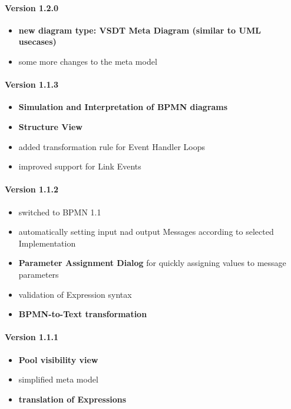 \paragraph{Version 1.2.0}
\begin{itemize}
	\item \textbf{new diagram type: VSDT Meta Diagram (similar to UML usecases)}
	\item some more changes to the meta model
\end{itemize}

\paragraph{Version 1.1.3}
\begin{itemize}
	\item \textbf{Simulation and Interpretation of BPMN diagrams}
	\item \textbf{Structure View}
	\item added transformation rule for Event Handler Loops
	\item improved support for Link Events
\end{itemize}

\paragraph{Version 1.1.2}
\begin{itemize}
	\item switched to BPMN 1.1
	\item automatically setting input nad output Messages according to selected Implementation
	\item \textbf{Parameter Assignment Dialog} for quickly assigning values to message parameters
	\item validation of Expression syntax
	\item \textbf{BPMN-to-Text transformation}
\end{itemize}

\paragraph{Version 1.1.1}
\begin{itemize}
	\item \textbf{Pool visibility view}
	\item simplified meta model
	\item \textbf{translation of Expressions}
\end{itemize}

